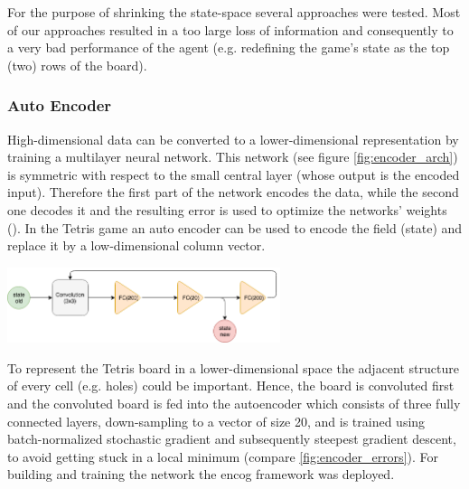 \vspace{0.25cm}

For the purpose of shrinking the state-space several approaches were tested. Most of our approaches resulted in a too large loss of information and consequently to a very bad performance of the agent (e.g. redefining the game's state as the top (two) rows of the board). 

\subsubsection{Auto Encoder}
High-dimensional data can be converted to a lower-dimensional representation by training a multilayer neural network. This network (see figure \ref{fig:encoder_arch}) is symmetric with respect to the small central layer (whose output is the encoded input). Therefore the first part of the network encodes the data, while the second one decodes it and the resulting error is used to optimize the networks' weights (\cite{autoencoder}). In the Tetris game an auto encoder can be used to encode the field (state) and replace it by a low-dimensional column vector. 

\begin{Figure}
\centering
\includegraphics[width=8cm]{imgs/encoder_structure.png}
\label{fig:encoder_arch}
\end{Figure}

To represent the Tetris board in a lower-dimensional space the adjacent structure of every cell (e.g. holes) could be important. Hence, the board is convoluted first and the convoluted board is fed into the autoencoder which consists of three fully connected layers, down-sampling to a vector of size 20, and is trained using batch-normalized stochastic gradient and subsequently steepest gradient descent, to avoid getting stuck in a local minimum (compare \ref{fig:encoder_errors}). For building and training the network the encog framework \cite{encog} was deployed.

